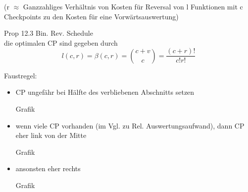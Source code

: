 (r $\approx$ Ganzzahliges Verhältnis von Kosten für Reversal von l Funktionen mit c Checkpoints zu den Kosten für eine Vorwärtsauswertung)

Prop 12.3 \glqq Bin. Rev. Schedule \grqq\\
die optimalen CP sind gegeben durch 
$$ l(c,r) = \beta(c,r) = \binom{c+v}{c} = \frac{(c+r)!}{c!r!}$$

Faustregel:
\begin{itemize}
	
	\item CP ungefähr bei Hälfte des verbliebenen Abschnitts setzen
	
	Grafik
	\item wenn viele CP vorhanden (im Vgl. zu Rel. Auswertungsaufwand), dann CP eher link von der Mitte
	
	Grafik
	\item ansonsten eher rechts
	
	Grafik
\end{itemize}
